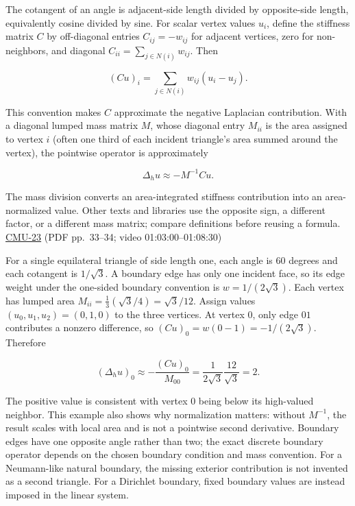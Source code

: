 The cotangent of an angle is adjacent-side length divided by opposite-side length, equivalently cosine divided by sine. For scalar vertex values \(u_i\), define the stiffness matrix \(C\) by off-diagonal entries \(C_{ij}=-w_{ij}\) for adjacent vertices, zero for non-neighbors, and diagonal \(C_{ii}=\sum_{j\in N(i)}w_{ij}\). Then

\[
(Cu)_i=\sum_{j\in N(i)}w_{ij}(u_i-u_j).
\]

This convention makes \(C\) approximate the negative Laplacian contribution. With a diagonal lumped mass matrix \(M\), whose diagonal entry \(M_{ii}\) is the area assigned to vertex \(i\) (often one third of each incident triangle's area summed around the vertex), the pointwise operator is approximately

\[
\Delta_hu\approx -M^{-1}Cu.
\]

The mass division converts an area-integrated stiffness contribution into an area-normalized value. Other texts and libraries use the opposite sign, a different factor, or a different mass matrix; compare definitions before reusing a formula. \hyperref[04-visual-computing-ii-ch036-cmu-23---physically-based-animation-and-pdes]{CMU-23} (PDF pp.~33--34; video 01:03:00--01:08:30)

For a single equilateral triangle of side length one, each angle is \(60\) degrees and each cotangent is \(1/\sqrt{3}\). A boundary edge has only one incident face, so its edge weight under the one-sided boundary convention is \(w=1/(2\sqrt3)\). Each vertex has lumped area \(M_{ii}=\frac13(\sqrt3/4)=\sqrt3/12\). Assign values \((u_0,u_1,u_2)=(0,1,0)\) to the three vertices. At vertex 0, only edge \(01\) contributes a nonzero difference, so \((Cu)_0=w(0-1)=-1/(2\sqrt3)\). Therefore

\[
(\Delta_hu)_0\approx-\frac{(Cu)_0}{M_{00}}
=\frac{1}{2\sqrt3}\frac{12}{\sqrt3}=2.
\]

The positive value is consistent with vertex 0 being below its high-valued neighbor. This example also shows why normalization matters: without \(M^{-1}\), the result scales with local area and is not a pointwise second derivative. Boundary edges have one opposite angle rather than two; the exact discrete boundary operator depends on the chosen boundary condition and mass convention. For a Neumann-like natural boundary, the missing exterior contribution is not invented as a second triangle. For a Dirichlet boundary, fixed boundary values are instead imposed in the linear system.

